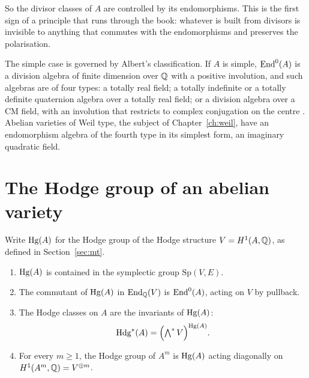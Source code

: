 So the divisor classes of $A$ are controlled by its endomorphisms. This is
the first sign of a principle that runs through the book: whatever is
built from divisors is invisible to anything that commutes with the
endomorphisms and preserves the polarisation.

The simple case is governed by Albert's classification. If $A$ is simple,
$\operatorname{End}^{0}(A)$ is a division algebra of finite dimension over $\mathbb{Q}$ with a
positive involution, and such algebras are of four types: a totally real
field; a totally indefinite or a totally definite quaternion algebra over
a totally real field; or a division algebra over a CM field, with an
involution that restricts to complex conjugation on the centre
\cite{Mum70}. Abelian varieties of Weil type, the subject of
Chapter~\ref{ch:weil}, have an endomorphism algebra of the fourth type in
its simplest form, an imaginary quadratic field.

\section{The Hodge group of an abelian variety}

Write $\operatorname{Hg}(A)$ for the Hodge group of the Hodge structure $V=H^{1}(A,\mathbb{Q})$,
as defined in Section~\ref{sec:mt}.

\begin{proposition}\label{prop:hgabelian}
\begin{enumerate}[label=(\roman*)]
\item $\operatorname{Hg}(A)$ is contained in the symplectic group $\mathrm{Sp}(V,E)$.
\item The commutant of $\operatorname{Hg}(A)$ in $\operatorname{End}_{\mathbb{Q}}(V)$ is $\operatorname{End}^{0}(A)$, acting on
$V$ by pullback.
\item The Hodge classes on $A$ are the invariants of $\operatorname{Hg}(A)$:
\[
  \operatorname{Hdg}^{*}(A)=\Bigl(\textstyle\bigwedge^{*}V\Bigr)^{\operatorname{Hg}(A)}.
\]
\item For every $m\ge1$, the Hodge group of $A^{m}$ is $\operatorname{Hg}(A)$ acting
diagonally on $H^{1}(A^{m},\mathbb{Q})=V^{\oplus m}$.
\end{enumerate}
\end{proposition}

